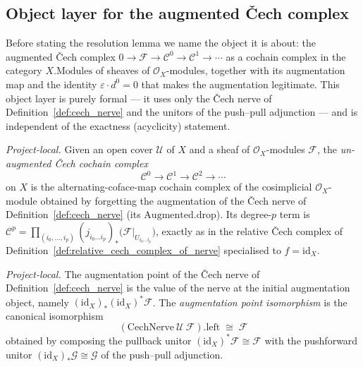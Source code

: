 \subsection{Object layer for the augmented {\v C}ech complex}

Before stating the resolution lemma we name the object it is about: the augmented {\v C}ech complex
\(0 \to \mathcal{F} \to \mathcal{C}^0 \to \mathcal{C}^1 \to \cdots\) as a cochain complex in the
category \(X.\mathrm{Modules}\) of sheaves of \(\mathcal{O}_X\)-modules, together with its augmentation
map and the identity \(\varepsilon \cdot d^0 = 0\) that makes the augmentation legitimate. This object
layer is purely formal --- it uses only the {\v C}ech nerve of Definition~\ref{def:cech_nerve} and the
unitors of the push--pull adjunction --- and is independent of the exactness (acyclicity) statement.

\begin{definition}

  \label{def:cech_complex_on_X}
  \textit{Project-local.}
  Given an open cover \(\mathcal{U}\) of \(X\) and a sheaf of \(\mathcal{O}_X\)-modules \(\mathcal{F}\),
  the \emph{un-augmented {\v C}ech cochain complex}
  \[
    \mathcal{C}^0 \to \mathcal{C}^1 \to \mathcal{C}^2 \to \cdots
  \]
  on \(X\) is the alternating-coface-map cochain complex of the cosimplicial \(\mathcal{O}_X\)-module
  obtained by forgetting the augmentation of the {\v C}ech nerve of Definition~\ref{def:cech_nerve}
  (its \(\mathrm{Augmented.drop}\)). Its degree-\(p\) term is \(\mathcal{C}^p =
  \prod_{(i_0, \ldots, i_p)} (j_{i_0 \ldots i_p})_*\bigl(\mathcal{F}|_{U_{i_0 \ldots i_p}}\bigr)\),
  exactly as in the relative {\v C}ech complex of
  Definition~\ref{def:relative_cech_complex_of_nerve} specialised to \(f = \mathrm{id}_X\).
\end{definition}

\begin{definition}

  \label{def:cech_nerve_point_iso}
  \textit{Project-local.}
  The augmentation point of the {\v C}ech nerve of Definition~\ref{def:cech_nerve} is the value of the
  nerve at the initial augmentation object, namely \((\mathrm{id}_X)_* (\mathrm{id}_X)^* \mathcal{F}\).
  The \emph{augmentation point isomorphism} is the canonical isomorphism
  \[
    (\mathrm{CechNerve}\ \mathcal{U}\ \mathcal{F}).\mathrm{left} \;\cong\; \mathcal{F}
  \]
  obtained by composing the pullback unitor \((\mathrm{id}_X)^* \mathcal{F} \cong \mathcal{F}\) with the
  pushforward unitor \((\mathrm{id}_X)_* \mathcal{G} \cong \mathcal{G}\) of the push--pull adjunction.
\end{definition}

